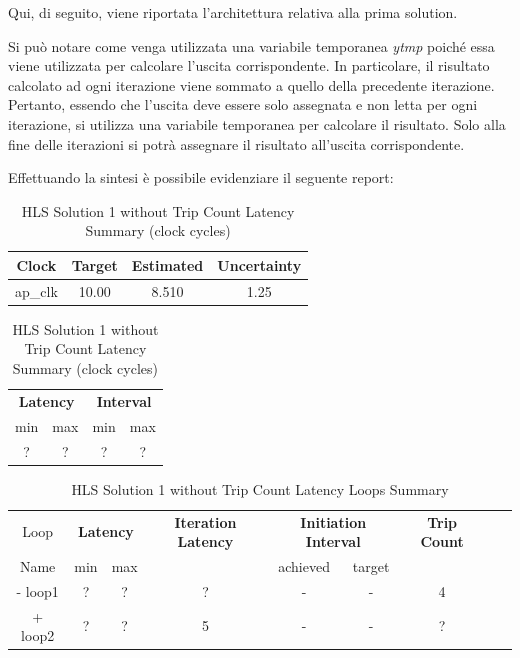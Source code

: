 Qui, di seguito, viene riportata l'architettura relativa alla prima solution. 



Si può notare come venga utilizzata una variabile temporanea \textit{ytmp} poiché essa viene utilizzata per calcolare l'uscita corrispondente. In particolare, il risultato calcolato ad ogni iterazione viene sommato a quello della precedente iterazione. Pertanto, essendo che l'uscita deve essere solo assegnata e non letta per ogni iterazione, si utilizza una variabile temporanea per calcolare il risultato. Solo alla fine delle iterazioni si potrà assegnare il risultato all'uscita corrispondente. 

Effettuando la sintesi è possibile evidenziare il seguente report:\\
\begin{table}[H]
	\centering
	\begin{minipage}[t]{0.45\linewidth}
		\centering
		\begin{tabular}{|c|c|c|c|}
			\hline
			\textbf{Clock} & \textbf{Target} & \textbf{Estimated} & \textbf{Uncertainty} \\
			\hline
			ap\_clk & 10.00 & 8.510 & 1.25 \\
			\hline
		\end{tabular}
		\caption{HLS Solution 1 without Trip Count Timing Summary (ns)}
		\label{tab:hls-solution-1-timing-summary}
	\end{minipage}
	\hfill
	\begin{minipage}[t]{0.45\linewidth}
		\centering
		\begin{tabular}{|c|c|c|c|}
			\hline
			\multicolumn{2}{|c|}{\textbf{Latency}} & \multicolumn{2}{|c|}{\textbf{Interval}} \\
			min & max & min & max \\
			\hline
			? & ? & ? & ? \\
			\hline
		\end{tabular}
		\caption{HLS Solution 1 without Trip Count Latency Summary (clock cycles)}
		\label{tab:hls-solution-1-latency-summary}
	\end{minipage}
\end{table}

\begin{table}[H]
	\centering
	\begin{tabular}{|c|c|c|c|c|c|c|c|c|}
		\hline
		\multicolumn{1}{|c|}{Loop} & \multicolumn{2}{|c|}{\textbf{Latency}} & \multicolumn{1}{c|}{\textbf{Iteration Latency}} & \multicolumn{2}{c|}{\textbf{Initiation Interval}} & \multicolumn{1}{c|}{\textbf{Trip Count}}  \\
		Name & min & max &  & achieved & target &  \\
		\hline
		- loop1 & ? & ? & ? & - & - & 4 \\
		+ loop2 & ? & ? & 5 & - & - & ? \\
		\hline
	\end{tabular}
	\caption{HLS Solution 1 without Trip Count Latency Loops Summary}
	\label{tab:hls-solution-1-loop-summary}
\end{table}

